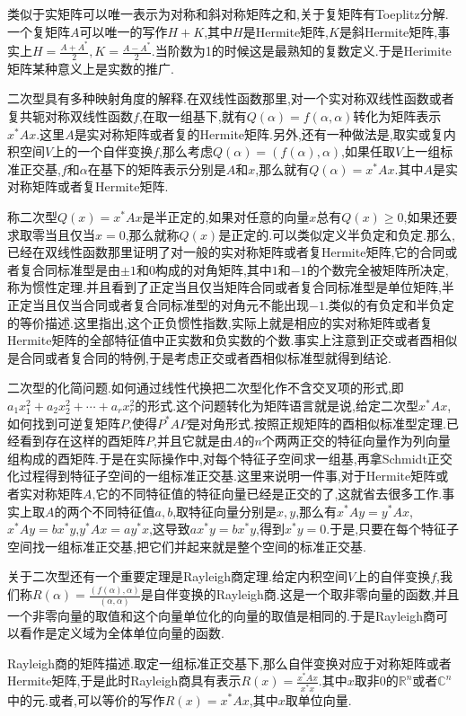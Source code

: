 类似于实矩阵可以唯一表示为对称和斜对称矩阵之和,关于复矩阵有Toeplitz分解.一个复矩阵$A$可以唯一的写作$H+K$,其中$H$是Hermite矩阵,$K$是斜Hermite矩阵,事实上$H=\frac{A+A^*}{2},K=\frac{A-A^*}{2}$.当阶数为1的时候这是最熟知的复数定义.于是Herimite矩阵某种意义上是实数的推广.

二次型具有多种映射角度的解释.在双线性函数那里,对一个实对称双线性函数或者复共轭对称双线性函数$f$,在取一组基下,就有$Q(\alpha)=f(\alpha,\alpha)$转化为矩阵表示$x^*Ax$.这里$A$是实对称矩阵或者复的Hermite矩阵.另外,还有一种做法是,取实或复内积空间$V$上的一个自伴变换$f$,那么考虑$Q(\alpha)=(f(\alpha),\alpha)$,如果任取$V$上一组标准正交基,$f$和$\alpha$在基下的矩阵表示分别是$A$和$x$,那么就有$Q(\alpha)=x^*Ax$.其中$A$是实对称矩阵或者复Hermite矩阵.

称二次型$Q(x)=x^*Ax$是半正定的,如果对任意的向量$x$总有$Q(x)\ge0$,如果还要求取零当且仅当$x=0$,那么就称$Q(x)$是正定的.可以类似定义半负定和负定.那么,已经在双线性函数那里证明了对一般的实对称矩阵或者复Hermite矩阵,它的合同或者复合同标准型是由$\pm1$和0构成的对角矩阵,其中$1$和$-1$的个数完全被矩阵所决定,称为惯性定理.并且看到了正定当且仅当矩阵合同或者复合同标准型是单位矩阵,半正定当且仅当合同或者复合同标准型的对角元不能出现$-1$.类似的有负定和半负定的等价描述.这里指出,这个正负惯性指数,实际上就是相应的实对称矩阵或者复Hermite矩阵的全部特征值中正实数和负实数的个数.事实上注意到正交或者酉相似是合同或者复合同的特例,于是考虑正交或者酉相似标准型就得到结论.

二次型的化简问题.如何通过线性代换把二次型化作不含交叉项的形式,即$a_1x_1^2+a_2x_2^2+\cdots+a_rx_r^2$的形式.这个问题转化为矩阵语言就是说,给定二次型$x^*Ax$,如何找到可逆复矩阵$P$,使得$P^*AP$是对角形式.按照正规矩阵的酉相似标准型定理.已经看到存在这样的酉矩阵$P$,并且它就是由$A$的$n$个两两正交的特征向量作为列向量组构成的酉矩阵.于是在实际操作中,对每个特征子空间求一组基,再拿Schmidt正交化过程得到特征子空间的一组标准正交基.这里来说明一件事,对于Hermite矩阵或者实对称矩阵$A$,它的不同特征值的特征向量已经是正交的了,这就省去很多工作.事实上取$A$的两个不同特征值$a,b$,取特征向量分别是$x,y$,那么有$x^*Ay=y^*Ax$,$x^*Ay=bx^*y$,$y^*Ax=ay^*x$,这导致$ax^*y=bx^*y$,得到$x^*y=0$.于是,只要在每个特征子空间找一组标准正交基,把它们并起来就是整个空间的标准正交基.

关于二次型还有一个重要定理是Rayleigh商定理.给定内积空间$V$上的自伴变换$f$,我们称$R(\alpha)=\frac{(f(\alpha),\alpha)}{(\alpha,\alpha)}$是自伴变换的Rayleigh商.这是一个取非零向量的函数,并且一个非零向量的取值和这个向量单位化的向量的取值是相同的.于是Rayleigh商可以看作是定义域为全体单位向量的函数.

Rayleigh商的矩阵描述.取定一组标准正交基下,那么自伴变换对应于对称矩阵或者Hermite矩阵,于是此时Rayleigh商具有表示$R(x)=\frac{x^*Ax}{x^*x}$.其中$x$取非0的$\mathbb{R}^n$或者$\mathbb{C}^n$中的元.或者,可以等价的写作$R(x)=x^*Ax$,其中$x$取单位向量.

